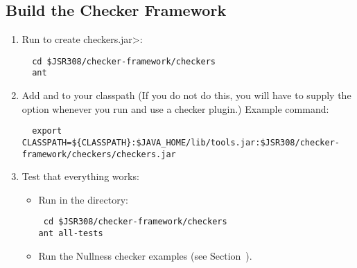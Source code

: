 \subsection{Build the Checker Framework\label{building}}


\begin{enumerate}

\item
Run  to create \<checkers.jar>:

\begin{Verbatim}
  cd $JSR308/checker-framework/checkers
  ant
\end{Verbatim}

\item Add  and  to your classpath
  (If you do not do this, you will have to supply the  option
  whenever you run  and use a checker plugin.)
  Example command:

\begin{smaller}
\begin{Verbatim}
  export CLASSPATH=${CLASSPATH}:$JAVA_HOME/lib/tools.jar:$JSR308/checker-framework/checkers/checkers.jar
\end{Verbatim}
\end{smaller}

\item Test that everything works:

  \begin{itemize}

  \item Run  in the  directory:
\begin{Verbatim}
 cd $JSR308/checker-framework/checkers
ant all-tests
\end{Verbatim}

  \item Run the Nullness checker examples (see
    Section~).

  \end{itemize}

\end{enumerate}


